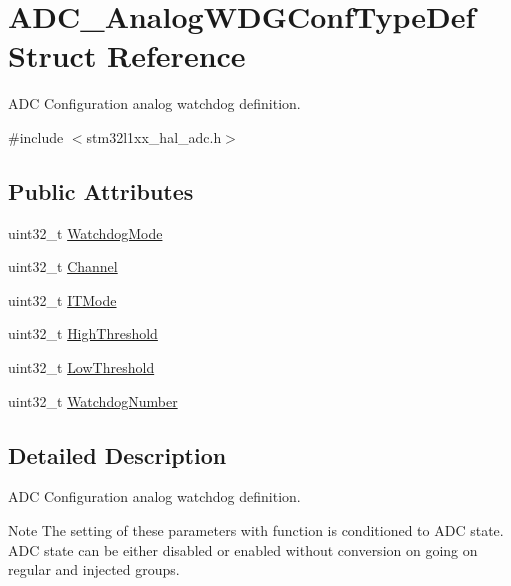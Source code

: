 \hypertarget{struct_a_d_c___analog_w_d_g_conf_type_def}{\section{A\-D\-C\-\_\-\-Analog\-W\-D\-G\-Conf\-Type\-Def Struct Reference}
\label{struct_a_d_c___analog_w_d_g_conf_type_def}
}


A\-D\-C Configuration analog watchdog definition.  




{\ttfamily \#include $<$stm32l1xx\-\_\-hal\-\_\-adc.\-h$>$}

\subsection*{Public Attributes}
\begin{DoxyCompactItemize}
\item 
uint32\-\_\-t \hyperlink{struct_a_d_c___analog_w_d_g_conf_type_def_ad4c60783321a30e8edffa323148e424d}{Watchdog\-Mode}
\item 
uint32\-\_\-t \hyperlink{struct_a_d_c___analog_w_d_g_conf_type_def_abc86b5861e3eff802fe765e62054f348}{Channel}
\item 
uint32\-\_\-t \hyperlink{struct_a_d_c___analog_w_d_g_conf_type_def_ab67703b11dbb0303fb5b56bd328ef06d}{I\-T\-Mode}
\item 
uint32\-\_\-t \hyperlink{struct_a_d_c___analog_w_d_g_conf_type_def_a9bee62b3d364713a16a15cefcc217e65}{High\-Threshold}
\item 
uint32\-\_\-t \hyperlink{struct_a_d_c___analog_w_d_g_conf_type_def_a77e1743ebd27333ac2c9de55a25cd4c8}{Low\-Threshold}
\item 
uint32\-\_\-t \hyperlink{struct_a_d_c___analog_w_d_g_conf_type_def_a025e81af21b93c5b8daf9f5241383302}{Watchdog\-Number}
\end{DoxyCompactItemize}


\subsection{Detailed Description}
A\-D\-C Configuration analog watchdog definition. 

\begin{DoxyNote}{Note}
The setting of these parameters with function is conditioned to A\-D\-C state. A\-D\-C state can be either disabled or enabled without conversion on going on regular and injected groups. 
\end{DoxyNote}


